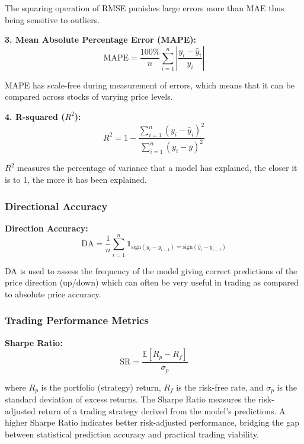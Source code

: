 \documentclass[12pt,a4paper]{article}
\begin{document}
The squaring operation of RMSE punishes large errors more than MAE thus being sensitive to outliers.

\textbf{3. Mean Absolute Percentage Error (MAPE):}
\begin{equation}
\text{MAPE} = \frac{100\%}{n} \sum_{i=1}^{n} \left|\frac{y_i - \hat{y}_i}{y_i}\right|
\end{equation}

MAPE has scale-free during measurement of errors, which means that it can be compared across stocks of varying price levels.

\textbf{4. R-squared ($R^2$):}
\begin{equation}
R^2 = 1 - \frac{\sum_{i=1}^{n}(y_i - \hat{y}_i)^2}{\sum_{i=1}^{n}(y_i - \bar{y})^2}
\end{equation}

$R^2$ measures the percentage of variance that a model has explained, the closer it is to 1, the more it has been explained.

\subsubsection{Directional Accuracy}

\textbf{Direction Accuracy:}
\begin{equation}
\text{DA} = \frac{1}{n} \sum_{i=1}^{n} \mathbb{1}_{\text{sign}(y_i - y_{i-1}) = \text{sign}(\hat{y}_i - y_{i-1})}
\end{equation}

DA is used to assess the frequency of the model giving correct predictions of the price direction (up/down) which can often be very useful in trading as compared to absolute price accuracy.

\subsubsection{Trading Performance Metrics}

\textbf{Sharpe Ratio:}
\begin{equation}
\text{SR} = \frac{\mathbb{E}[R_p - R_f]}{\sigma_p}
\end{equation}

where $R_p$ is the portfolio (strategy) return, $R_f$ is the risk-free rate, and $\sigma_p$ is the standard deviation of excess returns. The Sharpe Ratio measures the risk-adjusted return of a trading strategy derived from the model's predictions. A higher Sharpe Ratio indicates better risk-adjusted performance, bridging the gap between statistical prediction accuracy and practical trading viability.
\end{document}
